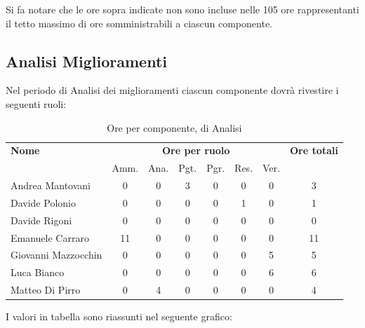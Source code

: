 Si fa notare che le ore sopra indicate non sono incluse nelle 105 ore rappresentanti il tetto massimo di ore somministrabili a ciascun componente.


\pagebreak
\subsection{Analisi Miglioramenti}
Nel periodo di Analisi dei miglioramenti ciascun componente dovrà rivestire i seguenti ruoli:

\begin{table}[H]
\begin{tabular}{lccccccc}
\toprule
    \textbf{Nome}  & \multicolumn{6}{c}{\textbf{Ore per ruolo}} & \textbf{Ore totali} \\
     & Amm. & Ana. & Pgt. & Pgr. & Res. & Ver. & \\
    \midrule
    
	   Andrea Mantovani & 0 & 0 & 3 & 0 & 0 & 0 & 3 \\
	     Davide Polonio & 0 & 0 & 0 & 0 & 1 & 0 & 1 \\
	      Davide Rigoni & 0 & 0 & 0 & 0 & 0 & 0 & 0 \\
	   Emanuele Carraro & 11 & 0 & 0 & 0 & 0 & 0 & 11 \\
	Giovanni Mazzocchin & 0 & 0 & 0 & 0 & 0 & 5 & 5 \\
	        Luca Bianco & 0 & 0 & 0 & 0 & 0 & 6 & 6 \\
	    Matteo Di Pirro & 0 & 4 & 0 & 0 & 0 & 0 & 4 \\
    
    \bottomrule
\end{tabular}
\caption{Ore per componente,  di Analisi}
\end{table}


I valori in tabella sono riassunti nel seguente grafico: \\ 


